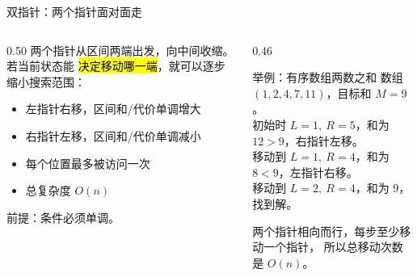 \documentclass[aspectratio=169]{beamer}
\begin{document}
\begin{frame}{双指针：两个指针面对面走}
    \begin{columns}[T]
        \begin{column}{0.50\textwidth}
            \small
            两个指针从区间两端出发，向中间收缩。若当前状态能
            \hl{决定移动哪一端}，就可以逐步缩小搜索范围：
            \begin{itemize}
                \item 左指针右移，区间和/代价单调增大
                \item 右指针左移，区间和/代价单调减小
                \item 每个位置最多被访问一次
                \item 总复杂度 $O(n)$
            \end{itemize}
            \vspace{0.4em}
            前提：条件必须单调。
        \end{column}
        \begin{column}{0.46\textwidth}
            \begin{exampleblock}{举例：有序数组两数之和}
                \footnotesize
                数组 $(1,2,4,7,11)$，目标和 $M=9$。\\
                初始时 $L=1,\ R=5$，和为 $12>9$，右指针左移。\\
                移动到 $L=1,\ R=4$，和为 $8<9$，左指针右移。\\
                移动到 $L=2,\ R=4$，和为 $9$，找到解。
            \end{exampleblock}
            \vspace{0.4em}
            \footnotesize
            两个指针相向而行，每步至少移动一个指针，
            所以总移动次数是 $O(n)$。
        \end{column}
    \end{columns}
\end{frame}
\end{document}
